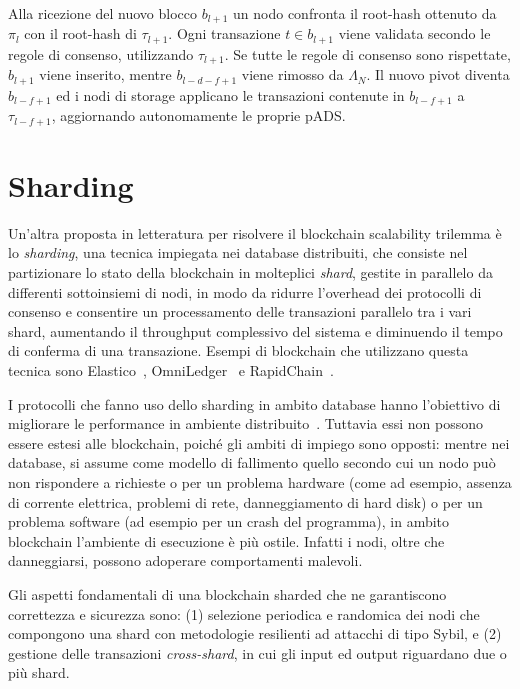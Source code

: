 Alla ricezione del nuovo blocco $b_{l+1}$ un nodo confronta il root-hash ottenuto da $\pi_l$ con il root-hash di $\tau_{l+1}$.  Ogni transazione $t \in b_{l+1}$ viene validata secondo le regole di consenso, utilizzando $\tau_{l+1}$. Se tutte le regole di consenso sono rispettate, $b_{l+1}$ viene inserito, mentre $b_{l-d-f+1}$ viene rimosso da $\Lambda_N$. Il nuovo pivot diventa $b_{l-f+1}$ ed i nodi di storage applicano le transazioni contenute in $b_{l-f+1}$ a $\tau_{l-f+1}$, aggiornando autonomamente le proprie pADS.

\section{Sharding}\label{sec:sharding}

Un'altra proposta in letteratura per risolvere il blockchain scalability trilemma è lo \emph{sharding}, una tecnica impiegata nei database distribuiti, che consiste nel partizionare lo stato della blockchain in molteplici \emph{shard}, gestite in parallelo da differenti sottoinsiemi di nodi, in modo da ridurre l'overhead dei protocolli di consenso e consentire un processamento delle transazioni parallelo tra i vari shard, aumentando il throughput complessivo del sistema e diminuendo il tempo di conferma di una transazione.
Esempi di blockchain che utilizzano questa tecnica sono Elastico~\cite{luu2016secure}, OmniLedger~\cite{kokoris2018omniledger} e RapidChain~\cite{zamani2018rapidchain}.

I protocolli che fanno uso dello sharding in ambito database hanno l'obiettivo di migliorare le performance in ambiente distribuito~\cite{cattell2011scalable, corbett2013spanner}.
Tuttavia essi non possono essere estesi alle blockchain, poiché gli ambiti di impiego sono opposti: mentre nei database, si assume come modello di fallimento quello secondo cui un nodo può non rispondere a richieste o per un problema hardware (come ad esempio, assenza di corrente elettrica, problemi di rete, danneggiamento di hard disk) o per un problema software (ad esempio per un crash del programma), in ambito blockchain l'ambiente di esecuzione è più ostile. Infatti i nodi, oltre che danneggiarsi, possono adoperare comportamenti malevoli.

Gli aspetti fondamentali di una blockchain sharded che ne garantiscono correttezza e sicurezza sono: (1) selezione periodica e randomica dei nodi che compongono una shard con metodologie resilienti ad attacchi di tipo Sybil, e (2) gestione delle transazioni \emph{cross-shard}, in cui gli input ed output riguardano due o più shard.


